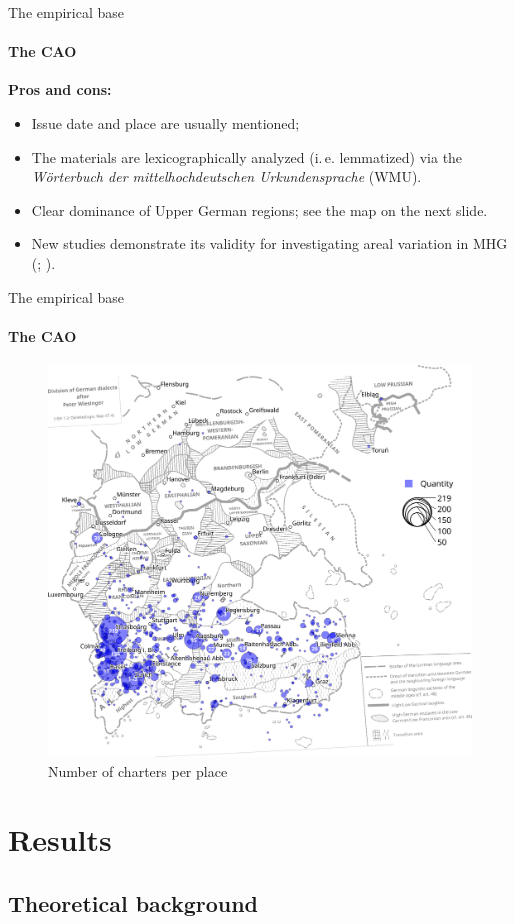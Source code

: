 \documentclass[xcolor=table, compress, %
handout
]{beamer}
\begin{document}
\begin{frame}{The empirical base}
\framesubtitle{The CAO}

\textbf{Pros and cons:}

\begin{itemize}
\item Issue date and place are usually mentioned;
\item The materials are lexicographically analyzed (i.\,e. lemmatized) via the \textit{Wörterbuch der mittelhochdeutschen Urkundensprache} (WMU).
\item Clear dominance of Upper German regions; see the map on the next slide. 
\end{itemize}

{\small
\begin{itemize}
\item[\Pointinghand] New studies demonstrate its validity for investigating areal variation in MHG (\citealt{beckerschallert21,beckerschallert22a,beckerschallert22b}; \citealt{HertelimErscheinen}).
\end{itemize}
}

\end{frame}


\begin{frame}{The empirical base}
\framesubtitle{The CAO}

	\begin{figure}
		\includegraphics[width=.55\linewidth]{placeunique.png}
		\caption{Number of charters per place \citep[background map adapted
		from][]{wiesinger1983:rede}}
	\end{figure}
\end{frame}


\section{Results}
\subsection{Theoretical background}
\end{document}
